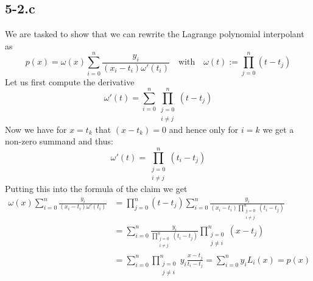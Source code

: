 \documentclass{article}
\begin{document}
\subsection*{5-2.c} We are tasked to show that we can rewrite the Lagrange polynomial interpolant as
\begin{equation*}
    p\left(x\right) = \omega\left(x\right) \sum_{i=0}^{n}\frac{y_{i}}{\left(x_{i} - t_{i}\right)\omega'\left(t_{i}\right)} \quad \text{with} \quad \omega\left(t\right) := \prod_{j=0}^{n}\left(t-t_{j}\right)
\end{equation*}
Let us first compute the derivative
\begin{equation*}
    \omega'\left(t\right) = \sum_{i=0}^{n}\prod_{\substack{j=0 \\ i \neq j}}^{n}\left(t-t_{j}\right)
\end{equation*}
Now we have for $x = t_{k}$ that $\left(x-t_{k}\right) = 0$ and hence only for $i = k$ we get a non-zero summand and thus:
\begin{equation*}
    \omega'\left(t\right) = \prod_{\substack{j=0 \\ i \neq j}}^{n}\left(t_{i}-t_{j}\right)
\end{equation*}
Putting this into the formula of the claim we get
\begin{align*}
    \omega\left(x\right) \sum_{i=0}^{n}\frac{y_{i}}{\left(x_{i} - t_{i}\right)\omega'\left(t_{i}\right)} &= \prod_{j=0}^{n}\left(t-t_{j}\right) \sum_{i=0}^{n}\frac{y_{i}}{\left(x_{i} - t_{i}\right)\prod_{\substack{j=0 \\ i \neq j}}^{n}\left(t_{i}-t_{j}\right)} \\[1mm]
    &= \sum_{i=0}^{n}\frac{y_{i}}{\prod_{\substack{j=0 \\ i \neq j}}^{n}\left(t_{i}-t_{j}\right)}\prod_{\substack{j=0 \\ j \neq i}}^{n}\left(x-t_{j}\right) \\[1mm]
    &=
    \sum_{i=0}^{n}\prod_{\substack{j=0 \\ j \neq i}}^{n}y_{i}\frac{x-t_{j}}{t_{i} -t_{j}} = \sum_{i=0}^{n}y_{i}L_{i}\left(x\right) = p\left(x\right)
\end{align*}
\end{document}
